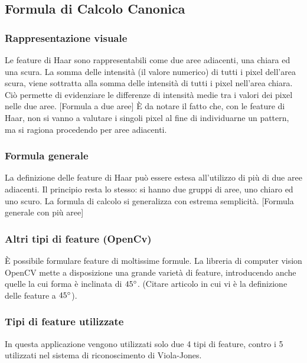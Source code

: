         \subsection{Formula di Calcolo Canonica} %
        \label{sub:formula_di_calcolo_canonica}
            \subsubsection{Rappresentazione visuale}
            Le feature di Haar sono rappresentabili come due aree adiacenti, una chiara ed una scura.
            La somma delle intensità (il valore numerico) di tutti i pixel dell'area scura, viene sottratta alla somma delle intensità di tutti i pixel nell'area chiara.
            Ciò permette di evidenziare le differenze di intensità medie tra i valori dei pixel nelle due aree.
            [Formula a due aree]
            È da notare il fatto che, con le feature di Haar, non si vanno a valutare i singoli pixel al fine di individuarne un pattern, ma si ragiona procedendo per aree adiacenti.

            \subsubsection{Formula generale}
            La definizione delle feature di Haar può essere estesa all'utilizzo di più di due aree adiacenti.
            Il principio resta lo stesso: si hanno due gruppi di aree, uno chiaro ed uno scuro.
            La formula di calcolo si generalizza con estrema semplicità.
            [Formula generale con più aree]

            \subsubsection{Altri tipi di feature (OpenCv)}
            È possibile formulare feature di moltissime formule.
            La libreria di computer vision OpenCV mette a disposizione una grande varietà di feature, introducendo anche quelle la cui forma è inclinata di $45\degree$. (Citare articolo in cui vi è la definizione delle feature a $45\degree$).

            \subsubsection{Tipi di feature utilizzate}
            In questa applicazione vengono utilizzati solo due 4 tipi di feature, contro i 5 utilizzati nel sistema di riconoscimento di Viola-Jones.
            
